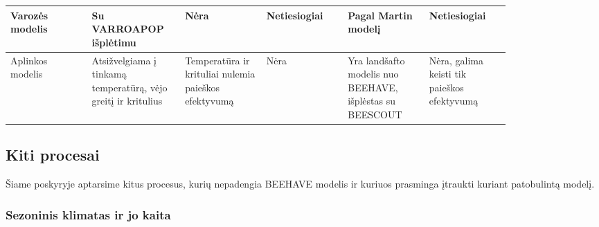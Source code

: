 \documentclass{VUMIFPSmagistrinis}
\begin{document}
\begin{table} [H]
\begin{tabular}{p{0.14\linewidth}|p{0.14\linewidth}|p{0.14\linewidth}|p{0.14\linewidth}|p{0.14\linewidth}|p{0.14\linewidth}}
\hline
Varozės modelis & Su VARROAPOP išplėtimu \cite{HoC05} & Nėra & Netiesiogiai & Pagal Martin modelį \cite{MAR01} & Netiesiogiai \\
\hline
Aplinkos modelis & Atsižvelgia\-ma į tinkamą temperatūrą, vėjo greitį ir kritulius & Temperatūra ir krituliai nulemia pa\-ieškos e\-fek\-ty\-vu\-mą & Nėra & Yra landšafto modelis nuo BEEHAVE, išplėstas su BEESCOUT & Nėra, galima keisti tik paieškos efektyvumą
\end{tabular}
\label{tab:models}
\end{table}


\subsection{Kiti procesai}

Šiame poskyryje aptarsime kitus procesus, kurių nepadengia BEEHAVE modelis ir kuriuos prasminga įtraukti kuriant patobulintą modelį.

\subsubsection{Sezoninis klimatas ir jo kaita}
\end{document}
